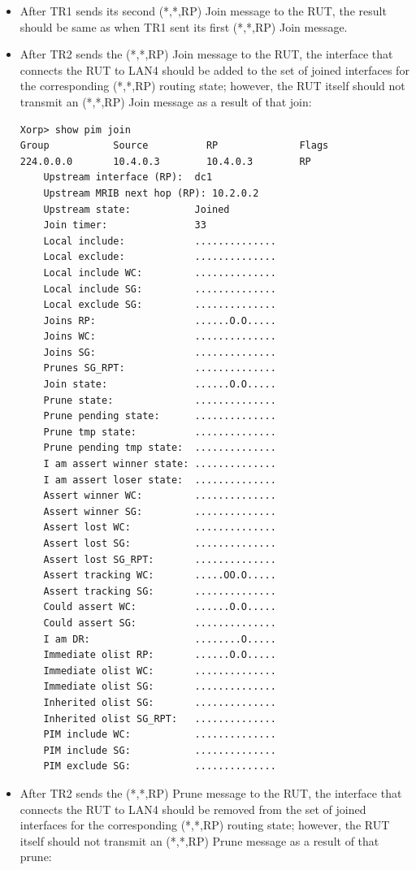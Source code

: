 \documentclass[11pt]{report}
\begin{document}
\begin{itemize}
  \item After TR1 sends its second (*,*,RP) Join message to the RUT, the
  result should be same as when TR1 sent its first (*,*,RP) Join message.

  \item After TR2 sends the (*,*,RP) Join message to the RUT, the interface
  that connects the RUT to LAN4 should be added to the set of joined
  interfaces for the corresponding (*,*,RP) routing state; however, the RUT
  itself should not transmit an (*,*,RP) Join message as a result of that
  join:

\begin{verbatim}
Xorp> show pim join 
Group           Source          RP              Flags
224.0.0.0       10.4.0.3        10.4.0.3        RP   
    Upstream interface (RP):  dc1
    Upstream MRIB next hop (RP): 10.2.0.2
    Upstream state:           Joined 
    Join timer:               33
    Local include:            ..............
    Local exclude:            ..............
    Local include WC:         ..............
    Local include SG:         ..............
    Local exclude SG:         ..............
    Joins RP:                 ......O.O.....
    Joins WC:                 ..............
    Joins SG:                 ..............
    Prunes SG_RPT:            ..............
    Join state:               ......O.O.....
    Prune state:              ..............
    Prune pending state:      ..............
    Prune tmp state:          ..............
    Prune pending tmp state:  ..............
    I am assert winner state: ..............
    I am assert loser state:  ..............
    Assert winner WC:         ..............
    Assert winner SG:         ..............
    Assert lost WC:           ..............
    Assert lost SG:           ..............
    Assert lost SG_RPT:       ..............
    Assert tracking WC:       .....OO.O.....
    Assert tracking SG:       ..............
    Could assert WC:          ......O.O.....
    Could assert SG:          ..............
    I am DR:                  ........O.....
    Immediate olist RP:       ......O.O.....
    Immediate olist WC:       ..............
    Immediate olist SG:       ..............
    Inherited olist SG:       ..............
    Inherited olist SG_RPT:   ..............
    PIM include WC:           ..............
    PIM include SG:           ..............
    PIM exclude SG:           ..............
\end{verbatim}

  \item After TR2 sends the (*,*,RP) Prune message to the RUT, the interface
  that connects the RUT to LAN4 should be removed from the set of joined
  interfaces for the corresponding (*,*,RP) routing state; however, the RUT
  itself should not transmit an (*,*,RP) Prune message as a result of that
  prune:


\end{itemize}
\end{document}
